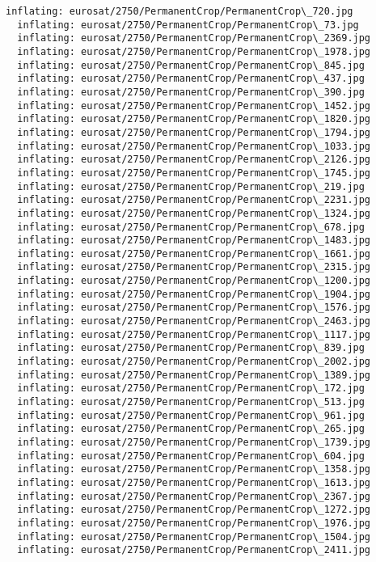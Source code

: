 \documentclass[11pt]{article}
\begin{document}
\begin{Verbatim}[commandchars=\\\{\}]
  inflating: eurosat/2750/PermanentCrop/PermanentCrop\_720.jpg
  inflating: eurosat/2750/PermanentCrop/PermanentCrop\_73.jpg
  inflating: eurosat/2750/PermanentCrop/PermanentCrop\_2369.jpg
  inflating: eurosat/2750/PermanentCrop/PermanentCrop\_1978.jpg
  inflating: eurosat/2750/PermanentCrop/PermanentCrop\_845.jpg
  inflating: eurosat/2750/PermanentCrop/PermanentCrop\_437.jpg
  inflating: eurosat/2750/PermanentCrop/PermanentCrop\_390.jpg
  inflating: eurosat/2750/PermanentCrop/PermanentCrop\_1452.jpg
  inflating: eurosat/2750/PermanentCrop/PermanentCrop\_1820.jpg
  inflating: eurosat/2750/PermanentCrop/PermanentCrop\_1794.jpg
  inflating: eurosat/2750/PermanentCrop/PermanentCrop\_1033.jpg
  inflating: eurosat/2750/PermanentCrop/PermanentCrop\_2126.jpg
  inflating: eurosat/2750/PermanentCrop/PermanentCrop\_1745.jpg
  inflating: eurosat/2750/PermanentCrop/PermanentCrop\_219.jpg
  inflating: eurosat/2750/PermanentCrop/PermanentCrop\_2231.jpg
  inflating: eurosat/2750/PermanentCrop/PermanentCrop\_1324.jpg
  inflating: eurosat/2750/PermanentCrop/PermanentCrop\_678.jpg
  inflating: eurosat/2750/PermanentCrop/PermanentCrop\_1483.jpg
  inflating: eurosat/2750/PermanentCrop/PermanentCrop\_1661.jpg
  inflating: eurosat/2750/PermanentCrop/PermanentCrop\_2315.jpg
  inflating: eurosat/2750/PermanentCrop/PermanentCrop\_1200.jpg
  inflating: eurosat/2750/PermanentCrop/PermanentCrop\_1904.jpg
  inflating: eurosat/2750/PermanentCrop/PermanentCrop\_1576.jpg
  inflating: eurosat/2750/PermanentCrop/PermanentCrop\_2463.jpg
  inflating: eurosat/2750/PermanentCrop/PermanentCrop\_1117.jpg
  inflating: eurosat/2750/PermanentCrop/PermanentCrop\_839.jpg
  inflating: eurosat/2750/PermanentCrop/PermanentCrop\_2002.jpg
  inflating: eurosat/2750/PermanentCrop/PermanentCrop\_1389.jpg
  inflating: eurosat/2750/PermanentCrop/PermanentCrop\_172.jpg
  inflating: eurosat/2750/PermanentCrop/PermanentCrop\_513.jpg
  inflating: eurosat/2750/PermanentCrop/PermanentCrop\_961.jpg
  inflating: eurosat/2750/PermanentCrop/PermanentCrop\_265.jpg
  inflating: eurosat/2750/PermanentCrop/PermanentCrop\_1739.jpg
  inflating: eurosat/2750/PermanentCrop/PermanentCrop\_604.jpg
  inflating: eurosat/2750/PermanentCrop/PermanentCrop\_1358.jpg
  inflating: eurosat/2750/PermanentCrop/PermanentCrop\_1613.jpg
  inflating: eurosat/2750/PermanentCrop/PermanentCrop\_2367.jpg
  inflating: eurosat/2750/PermanentCrop/PermanentCrop\_1272.jpg
  inflating: eurosat/2750/PermanentCrop/PermanentCrop\_1976.jpg
  inflating: eurosat/2750/PermanentCrop/PermanentCrop\_1504.jpg
  inflating: eurosat/2750/PermanentCrop/PermanentCrop\_2411.jpg

\end{Verbatim}
\end{document}
